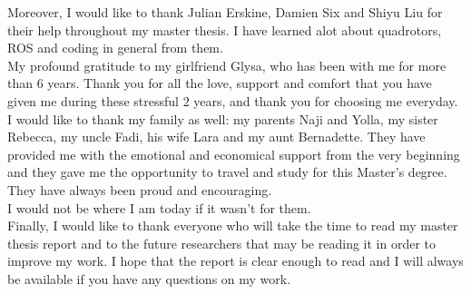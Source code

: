\documentclass{thesisreport}
\begin{document}
Moreover, I would like to thank Julian Erskine, Damien Six and Shiyu Liu for their help throughout my master thesis. I have learned alot about quadrotors, ROS and coding in general from them. \\

My profound gratitude to my girlfriend Glysa, who has been with me for more than 6 years. Thank you for all the love, support and comfort that you have given me during these stressful 2 years, and thank you for choosing me everyday. \\

I would like to thank my family as well: my parents Naji and Yolla, my sister Rebecca, my uncle Fadi, his wife Lara and my aunt Bernadette. They have provided me with the emotional and economical support from the very beginning and they gave me the opportunity to travel and study for this Master's degree. They have always been proud and encouraging. \\I would not be where I am today if it wasn't for them. \\

Finally, I would like to thank everyone who will take the time to read my master thesis report and to the future researchers that may be reading it in order to improve my work. I hope that the report is clear enough to read and I will always be available if you have any questions on my work.
 
 \newpage
 
 
\end{document}

